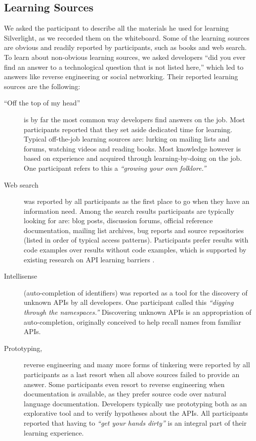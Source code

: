 \moarsauce
\subsection{Learning Sources}
We asked the participant to describe all the  materials he used for learning Silverlight, as we recorded them on the whiteboard. Some of the learning sources are obvious and readily reported by participants, such as books and web search. To learn about non-obvious learning sources, we asked developers ``did you ever find an answer to a technological question that is not listed here,'' which led to answers like reverse engineering or social networking. Their reported learning sources are the following:

\begin{description}
\item[``Off the top of my head''] is by far the most common way developers find answers on the job. Most participants reported that they set aside dedicated time for learning. Typical off-the-job learning sources are: lurking on mailing lists and forums, watching videos and reading books. Most knowledge however is based on experience and acquired through learning-by-doing on the job. One participant refers to this a \emph{``growing your own folklore.''}

\item[Web search] was reported by all participants as the first place to go when they have an information need. Among the search results participants are typically looking for are: blog posts, discussion forums, official reference documentation, mailing list archives, bug reports and source repositories (listed in order of typical access patterns). 
Participants prefer results with code examples over results without code examples, which is supported by existing research on API learning barriers \cite{robillard09}.

\item[Intellisense] (\ie auto-completion of identifiers) was reported as a tool for the discovery of unknown APIs by all developers. One participant called this \emph{``digging through the namespaces.''} Discovering unknown APIs is an appropriation of auto-completion, originally conceived to help recall names from familiar APIs. 

\item[Prototyping,] reverse engineering and many more forms of tinkering were reported by all participants as a last resort when all above sources failed to provide an answer. 
Some participants even resort to reverse engineering when documentation is available, as they prefer source code over natural language documentation. 
Developers typically use prototyping both as an explorative tool and to verify hypotheses about the APIs. All participants reported that having to \emph{``get your hands dirty''} is an integral part of their learning experience. 


\end{description}
